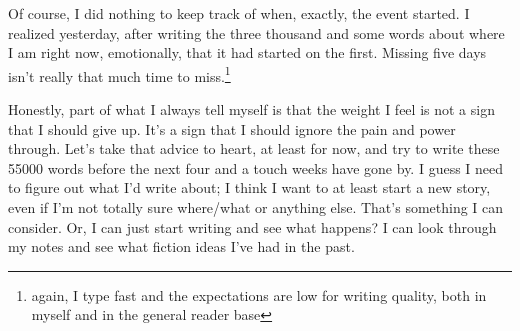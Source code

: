 \documentclass[12pt]{article}
\renewcommand{\,}{\textsuperscript{,}}
\begin{document}
Of course, I did nothing to keep track of when, exactly, the event started.  
I realized yesterday, after writing the three thousand and some words about where I am right now, emotionally, that it had started on the first.  
Missing five days isn't really that much time to miss.\footnote{again, I type fast and the expectations are low for writing quality, both in myself and in the general reader base}

Honestly, part of what I always tell myself is that the weight I feel is not a sign that I should give up. It's a sign that I should ignore the pain and power through.  
Let's take that advice to heart, at least for now, and try to write these 55000 words before the next four and a touch weeks have gone by.  
I guess I need to figure out what I'd write about; I think I want to at least start a new story, even if I'm not totally sure where/what or anything else.  
That's something I can consider.  
Or, I can just start writing and see what happens?  
I can look through my notes and see what fiction ideas I've had in the past.
\end{document}
